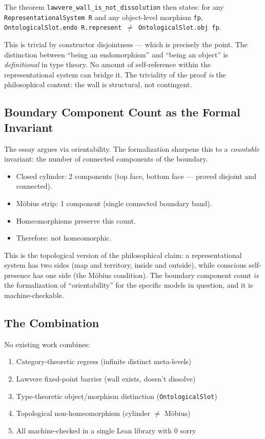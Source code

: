 \documentclass[11pt]{article}
\begin{document}
The theorem \texttt{lawvere\_wall\_is\_not\_dissolution} then states:
for any \texttt{RepresentationalSystem R} and any object-level morphism \texttt{fp},
\texttt{OntologicalSlot.endo R.represent $\neq$ OntologicalSlot.obj fp}.

This is trivial by constructor disjointness --- which is precisely the point.
The distinction between ``being an endomorphism'' and ``being an object'' is
\emph{definitional} in type theory. No amount of self-reference within the
representational system can bridge it. The triviality of the proof \emph{is}
the philosophical content: the wall is structural, not contingent.

\subsection{Boundary Component Count as the Formal Invariant}

The essay argues via orientability. The formalization sharpens this to a
\emph{countable} invariant: the number of connected components of the boundary.

\begin{itemize}
\item Closed cylinder: 2 components (top face, bottom face --- proved disjoint and connected).
\item M\"obius strip: 1 component (single connected boundary band).
\item Homeomorphisms preserve this count.
\item Therefore: not homeomorphic.
\end{itemize}

This is the topological version of the philosophical claim: a representational
system has two sides (map and territory, inside and outside), while conscious
self-presence has one side (the M\"obius condition). The boundary component count
\emph{is} the formalization of ``orientability'' for the specific models in
question, and it is machine-checkable.

\subsection{The Combination}

No existing work combines:
\begin{enumerate}
\item Category-theoretic regress (infinite distinct meta-levels)
\item Lawvere fixed-point barrier (wall exists, doesn't dissolve)
\item Type-theoretic object/morphism distinction (\texttt{OntologicalSlot})
\item Topological non-homeomorphism (cylinder $\neq$ M\"obius)
\item All machine-checked in a single Lean library with 0 sorry
\end{enumerate}
\end{document}
